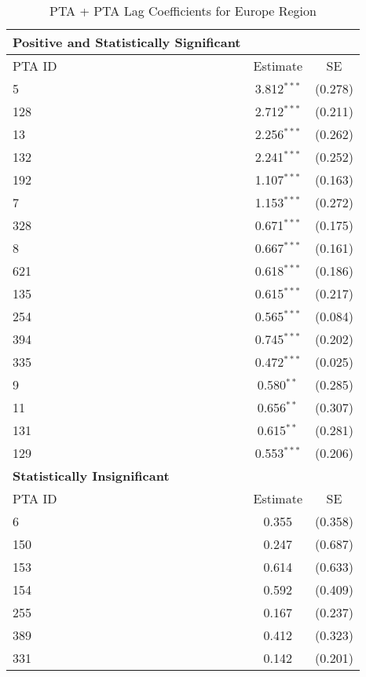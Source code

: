 \begin{table}[htbp]
    \centering
    \caption{PTA + PTA Lag Coefficients for Europe Region}
    \label{tab:pta_europe}
    \begin{adjustbox}{max width=\textwidth}
    \begin{tabular}{lcc}
    \hline
    \textbf{Positive and Statistically Significant} &  &  \\
    \hline
    PTA ID & Estimate & SE \\
    \hline
    5   & 3.812$^{\ast\ast\ast}$ & (0.278) \\
    128 & 2.712$^{\ast\ast\ast}$ & (0.211) \\
    13  & 2.256$^{\ast\ast\ast}$ & (0.262) \\
    132 & 2.241$^{\ast\ast\ast}$ & (0.252) \\
    192 & 1.107$^{\ast\ast\ast}$ & (0.163) \\
    7   & 1.153$^{\ast\ast\ast}$ & (0.272) \\
    328 & 0.671$^{\ast\ast\ast}$ & (0.175) \\
    8   & 0.667$^{\ast\ast\ast}$ & (0.161) \\
    621 & 0.618$^{\ast\ast\ast}$ & (0.186) \\
    135 & 0.615$^{\ast\ast\ast}$ & (0.217) \\
    254 & 0.565$^{\ast\ast\ast}$ & (0.084) \\
    394 & 0.745$^{\ast\ast\ast}$ & (0.202) \\
    335 & 0.472$^{\ast\ast\ast}$ & (0.025) \\
    9   & 0.580$^{\ast\ast}$ & (0.285) \\
    11  & 0.656$^{\ast\ast}$ & (0.307) \\
    131 & 0.615$^{\ast\ast}$ & (0.281) \\
    129 & 0.553$^{\ast\ast\ast}$ & (0.206) \\
    \hline
    \textbf{Statistically Insignificant} &  &  \\
    \hline
    PTA ID & Estimate & SE \\
    \hline
    6   & 0.355 & (0.358) \\
    150 & 0.247 & (0.687) \\
    153 & 0.614 & (0.633) \\
    154 & 0.592 & (0.409) \\
    255 & 0.167 & (0.237) \\
    389 & 0.412 & (0.323) \\
    331 & 0.142 & (0.201) \\

\end{tabular}
\end{adjustbox}
\end{table}
